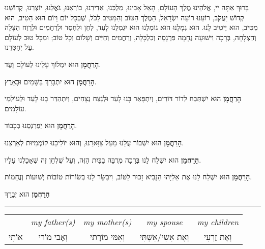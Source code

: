 \vspace{1em}

בָּרוּךְ אַתָּה יי, אֱלֹהֵינוּ מֶלֶךְ הָעוֹלָם, הָאֵל אָבִינוּ, מַלְכֵּנוּ, אַדִירֵנוּ, בּוֹרְאֵנוּ, גֹּאֲלֵנוּ, יוֹצְרֵנוּ, קְדוֹשֵׁנוּ קְדוֹשׁ יַעֲקֹב, רוֹעֵנוּ רוֹעֵה יִשְׂרָאַל, הַמֶּלֶךְ הַטּוֹב וְהַמֵּטִיב לַכֹּל, שֶׁבְּכָל יוֹם וָיוֹם הוּא הֵטִיב, הוּא מֵטִיב, הוּא יֵיטִיב לָנוּ. הוּא גְמָלָנוּ הוּא גוֹמְלֵנוּ הוּא יִגְמְלֵנוּ לָעַד, לְחֵן וּלְחֶסֶד וּלְרַחֲמִים וּלְרֶוַח הַצָּלָה וְהַצְלָחָה, בְּרָכָה וִישׁוּעָה נֶחָמָה פַּרְנָסָה וְכַלְכָּלָה, וְרַחֲמִים וְחַיִּים וְשָׁלוֹם וְכָל טוֹב; וּמִכָּל טוּב לְעוֹלָם עַל יְחַסְּרֵנוּ.

\vspace{1em}

\begin{center}

{\bf הָרַחֲמָן}
הוּא יִמְלוֹךְ עָלֵינוּ לְעוֹלָם וָעֶד.

{\bf הָרַחֲמָן}
הוּא יִתְבָּרַךְ בַּשָּׁמַיִם וּבָאָרֶץ.

{\bf הָרַחֲמָן}
הוּא יִשְׁתַּבַּח לְדוֹר דּוֹרִים, וְיִתְפָּאַר בָּנוּ לָעַד וּלְנֵצַח נְצָחִים, וְיִתְהַדַּר בָּנוּ לָעַד וּלְעוֹלְמֵי עוֹלָמִים.

{\bf הָרַחֲמָן}
הוּא יְפַרְנְסֵנוּ בְּכָבוֹד.

{\bf הָרַחֲמָן}
הוּא יִשְׁבּוֹר עֻלֵּנוּ מֵעַל צַּוָּארֵנוּ, וְהוּא יוֹלִיכֵנוּ קוֹמְמִיוּת לְאַרְצֵנוּ.

{\bf הָרַחֲמָן}
הוּא יִשְׁלַח לָנוּ בְּרָכָה מְרֻבָּה בַּבַּיִת הַזֶּה, וְעַל שֻׁלְחָן זֶה שֶׁאָכַלְנוּ עָלָיו.

{\bf הָרַחֲמָן}
הוּא יִשְׁלַח לָנוּ אֶת אֵלִיָּהוּ הַנָּבִיא זָכוּר לַטּוֹב, וִיבַשֵּׂר לָנוּ בְּשׂוֹרוֹת טוֹבוֹת יְשׁוּעוֹת וְנֶחָמוֹת.



\break

{\large \bf
הָרַחֲמָן
}
הוּא יְבָרֵךְ 
\hrule


\begin{tabular}{c c c c c}

	& \textenglish{\itshape my father(s)}
		& \textenglish{\itshape my mother(s)}
			& \textenglish{\itshape my spouse}
				& \textenglish{\itshape my children}\\
					
אוֹתִי & וְאָבי מוֹרי & וְאִמּי מוֹרָתי & וְאֶת אִשִי/אִשְׁתִּי & וְאֶת זַרְעִי \\
\end{tabular}


\end{center}
